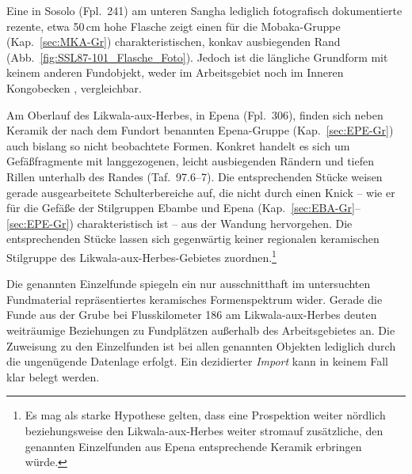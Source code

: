 Eine in Sosolo (Fpl.~241) am unteren \mbox{Sangha} lediglich fotografisch dokumentierte rezente, etwa 50\,cm hohe Flasche zeigt einen für die Mobaka-Gruppe (Kap.~\ref{sec:MKA-Gr}) charakteristischen, konkav ausbiegenden Rand (Abb.~\ref{fig:SSL87-101_Flasche_Foto}). Jedoch ist die längliche Grundform mit keinem anderen Fundobjekt, weder im Arbeitsgebiet noch im Inneren Kongobecken \parencite[siehe][]{Wotzka.1995}, vergleichbar.

Am Oberlauf des Likwala-aux-Herbes, in Epena (Fpl.~306), finden sich neben Keramik der nach dem Fundort benannten Epena-Gruppe (Kap.~\ref{sec:EPE-Gr}) auch bislang so nicht beobachtete Formen. Konkret handelt es sich um Gefäßfragmente mit langgezogenen, leicht ausbiegenden Rändern und tiefen Rillen unterhalb des Randes (Taf.~97.6--7). Die entsprechenden Stücke weisen gerade ausgearbeitete Schulterbereiche auf, die nicht durch einen Knick -- wie er für die Gefäße der Stilgruppen Ebambe und Epena (Kap.~\ref{sec:EBA-Gr}--\ref{sec:EPE-Gr}) charakteristisch ist -- aus der Wandung hervorgehen. Die entsprechenden Stücke lassen sich gegenwärtig keiner regionalen keramischen Stilgruppe des Likwala-aux-Herbes-Gebietes zuordnen.\footnote{Es mag als starke Hypothese gelten, dass eine Prospektion weiter nördlich beziehungsweise den \mbox{Likwala}-\mbox{aux}-\mbox{Herbes} weiter stromauf zusätzliche, den genannten Einzelfunden aus Epena entsprechende Keramik erbringen würde.}

Die genannten Einzelfunde spiegeln ein nur ausschnitthaft im untersuchten Fundmaterial repräsentiertes keramisches Formenspektrum wider. Gerade die Funde aus der Grube bei Flusskilometer 186 am \mbox{Likwala}-\mbox{aux}-\mbox{Herbes} deuten weiträumige Beziehungen zu Fundplätzen außerhalb des Arbeitsgebietes an. Die Zuweisung zu den Einzelfunden ist bei allen genannten Objekten lediglich durch die ungenügende Datenlage erfolgt. Ein dezidierter \textit{Import} kann in keinem Fall klar belegt werden. 
